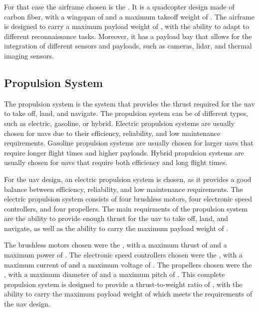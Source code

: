 For that case the airframe chosen  is the . It is a quadcopter design made of carbon fiber, with a wingspan of  and a maximum takeoff weight of . The airframe is designed to carry a maximum payload weight of , with the ability to adapt to different reconnaissance tasks. Moreover, it has a payload bay that allows for the integration of different sensors and payloads, such as cameras, lidar, and thermal imaging sensors.


\subsection{Propulsion System}

The propulsion system is the system that provides the thrust required for the \gls{uav} to take off, land, and navigate. The propulsion system can be of different types, such as electric, gasoline, or hybrid. Electric propulsion systems are usually chosen for \glspl{uav} due to their efficiency, reliability, and low maintenance requirements. Gasoline propulsion systems are usually chosen for larger \glspl{uav} that require longer flight times and higher payloads. Hybrid propulsion systems are usually chosen for \glspl{uav} that require both efficiency and long flight times.

For the \gls{uav} design, an electric propulsion system is chosen, as it provides a good balance between efficiency, reliability, and low maintenance requirements. The electric propulsion system consists of four brushless motors, four electronic speed controllers, and four propellers. The main requirments of the propulsion system are the ability to provide enough thrust for the \gls{uav} to take off, land, and navigate, as well as the ability to carry the maximum payload weight of .

The brushless motors chosen were the , with a maximum thrust of  and a maximum power of . The electronic speed controllers chosen were the , with a maximum current of  and a maximum voltage of . The propellers chosen were the , with a maximum diameter of  and a maximum pitch of . This complete propulsion system is designed to provide a thrust-to-weight ratio of , with the ability to carry the maximum payload weight of  which meets the requirements of the \gls{uav} design.

